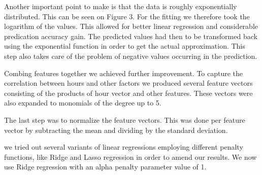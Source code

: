 \documentclass[a4paper, 11pt]{article}
\begin{document}
Another important point to make is that the data is roughly exponentially distributed. This can be seen on Figure 3. For the fitting we therefore took the logarithm of the values. This allowed for better linear regression and considerable predication accuracy gain. The predicted values had then to be transformed back using the exponential function in order to get the actual approximation. This step also takes care of the problem of negative values occurring in the prediction.

Combing features together we achieved further improvement. To capture the correlation between hours and other factors we produced several feature vectors consisting of the products of hour vector and other features. These vectors were also expanded to monomials of the degree up to 5. 

The last step was to normalize the feature vectors. This was done per feature vector by subtracting the mean and dividing by the standard deviation.

we tried out several variants of linear regressions employing different penalty functions, like Ridge and Lasso regression in order to amend our results. We now use Ridge regression with an alpha penalty parameter value of 1.
\end{document}
